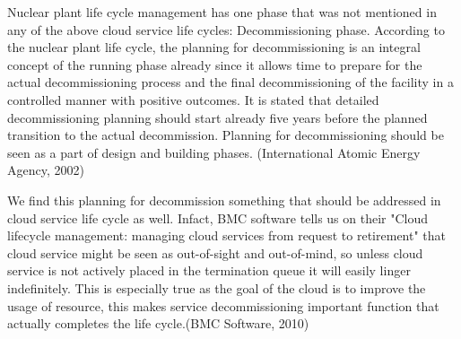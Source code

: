 \documentclass{article}
\begin{document}
\par
Nuclear plant life cycle management has one phase that was not mentioned in any of the above cloud service life cycles: Decommissioning phase. According to the nuclear plant life cycle, the planning for decommissioning is an integral concept of the running phase already since it allows time to prepare for the actual decommissioning process and the final decommissioning of the facility in a controlled manner with positive outcomes. It is stated that detailed decommissioning planning should start already five years before the planned transition to the actual decommission. Planning for decommissioning should be seen as a part of design and building phases. (International Atomic Energy Agency, 2002)
\par
We find this planning for decommission something that should be addressed in cloud service life cycle as well. Infact, BMC software tells us on their "Cloud lifecycle management: managing cloud services from request to retirement" that cloud service might be seen as out-of-sight and out-of-mind, so unless cloud service is not actively placed in the termination queue it will easily linger indefinitely. This is especially true as the goal of the cloud is to improve the usage of resource, this makes service decommissioning important function that actually completes the life cycle.(BMC Software, 2010)
\end{document}
